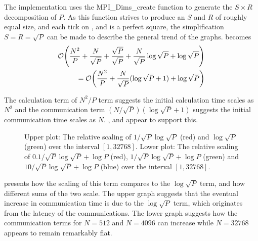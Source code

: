 The implementation uses the MPI\_Dims\_create function to generate
the $S\times{}R$ decomposition of $P$.
%
As this function strives to
produce an $S$ and $R$ of roughly equal size, and each tick on
,
 and
is a perfect square, the simplification $S = R = \sqrt{P}$
can be made to describe the general trend of the graphs.
%
becomes
\begin{equation}
    \label{eqn:replicated_systolic_pair_operation_simplified_time}
    \begin{split}
        \mathcal{O}{\left({ 
            \frac{N^2}{P}
            + \frac{N}{\sqrt{P}}
            + \frac{\sqrt{P}}{\sqrt{P}}
            + \frac{N}{\sqrt{P}}\log{\sqrt{P}}
            + \log{\sqrt{P}}
         }\right)} \\
        = \mathcal{O}{\left({ 
            \frac{N^2}{P}
            + \frac{N}{\sqrt{P}}(\log{\sqrt{P}}+1)
            + \log{\sqrt{P}}
         }\right)}
    \end{split}
\end{equation}

The calculation term of $N^2/P$ term suggests
the initial calculation time scales as $N^2$
and the communication term $(N/\sqrt{P}) (\log{\sqrt{P}}+1)$ suggests
the initial communication time scales as $N$.
%
,
 and
appear to support this.


\begin{figure}
    
    \caption{
        Upper plot: The relative scaling of
        $1/\sqrt{P}\log{\sqrt{P}}$ (red) and
        $\log{\sqrt{P}}$ (green)
        over the interval $[1,32768]$.
        Lower plot: The relative scaling of
        $0.1/\sqrt{P}\log{\sqrt{P}} + \log{P}$ (red),
        $1/\sqrt{P}\log{\sqrt{P}} + \log{P}$ (green) and
        $10/\sqrt{P}\log{\sqrt{P}} + \log{P}$ (blue)
        over the interval $[1,32768]$.
    }
    \label{fig:log_vs_log_sqrt_p}
\end{figure}

 presents how the scaling of this term compares
to the $\log{\sqrt{P}}$ term, and how different sums of the two scale.
%
The upper graph suggests that the eventual increase in communication time is
due to the $\log{\sqrt{P}}$ term, which originates from the latency
of the communications.
%
The lower graph suggests
how the communication terms for $N = 512$ and $N = 4096$ can
increase while $N = 32768$ appears to remain remarkably flat.

